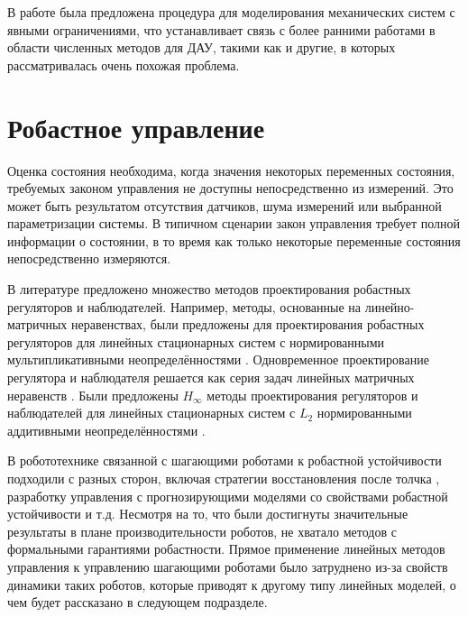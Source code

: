 В работе \cite{Aghili2003} была предложена процедура для моделирования механических систем с явными ограничениями, что устанавливает связь с более ранними работами в области численных методов для ДАУ, такими как \cite{Liang1987} и другие, в которых рассматривалась очень похожая проблема.

\section{Робастное управление}\label{sec:ch1/sec4}
Оценка состояния необходима, когда значения некоторых переменных состояния, требуемых законом управления не доступны непосредственно из измерений. Это может быть результатом отсутствия датчиков, шума измерений или выбранной параметризации системы. В типичном сценарии закон управления требует полной информации о состоянии, в то время как только некоторые переменные состояния непосредственно измеряются.

В литературе предложено множество методов проектирования робастных регуляторов и наблюдателей. Например, методы, основанные на линейно-матричных неравенствах, были предложены для проектирования робастных регуляторов для линейных стационарных систем с нормированными мультипликативными неопределённостями \cite{POLYAK2021,ROTONDO2014}.
Одновременное проектирование регулятора и наблюдателя решается как серия задач линейных матричных неравенств \cite{ZEMOUCHE2015,GRITLI2021}. Были предложены $H_\infty$ методы проектирования регуляторов и наблюдателей для линейных стационарных систем с $L_2$ нормированными аддитивными неопределённостями \cite{Bennani2019, KHELOUFI2016}.

В робототехнике связанной с шагающими роботами к робастной устойчивости подходили с разных сторон, включая стратегии восстановления после толчка \cite{Pratt2006}, разработку управления с прогнозирующими моделями со свойствами робастной устойчивости \cite{KIM2019} и т.д. Несмотря на то, что были достигнуты значительные результаты в плане производительности роботов, не хватало методов с формальными гарантиями робастности. Прямое применение линейных методов управления к управлению шагающими роботами было затруднено из-за свойств динамики таких роботов, которые приводят к другому типу линейных моделей, о чем будет рассказано в следующем подразделе.

